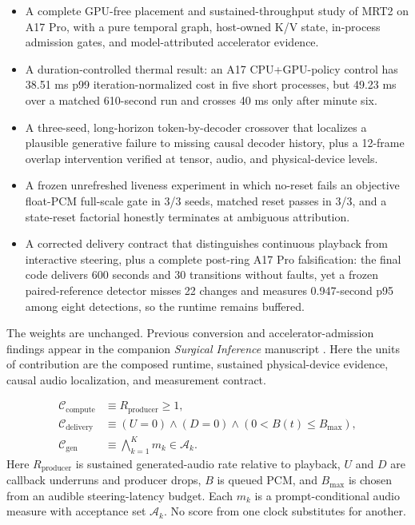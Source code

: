 \documentclass[10pt]{article}
\begin{document}
\begin{itemize}
\item A complete GPU-free placement and sustained-throughput study of MRT2 on A17 Pro, with a pure temporal graph, host-owned K/V state, in-process admission gates, and model-attributed accelerator evidence.
\item A duration-controlled thermal result: an A17 CPU+GPU-policy control has 38.51 ms p99 iteration-normalized cost in five short processes, but 49.23 ms over a matched 610-second run and crosses 40 ms only after minute six.
\item A three-seed, long-horizon token-by-decoder crossover that localizes a plausible generative failure to missing causal decoder history, plus a 12-frame overlap intervention verified at tensor, audio, and physical-device levels.
\item A frozen unrefreshed liveness experiment in which no-reset fails an objective float-PCM full-scale gate in 3/3 seeds, matched reset passes in 3/3, and a state-reset factorial honestly terminates at ambiguous attribution.
\item A corrected delivery contract that distinguishes continuous playback from interactive steering, plus a complete post-ring A17 Pro falsification: the final code delivers 600 seconds and 30 transitions without faults, yet a frozen paired-reference detector misses 22 changes and measures 0.947-second p95 among eight detections, so the runtime remains buffered.
\end{itemize}
The weights are unchanged. Previous conversion and accelerator-admission findings appear in the companion \emph{Surgical Inference} manuscript \citep{surgical-inference}. Here the units of contribution are the composed runtime, sustained physical-device evidence, causal audio localization, and measurement contract.


\begin{align}
\mathcal{C}_{\mathrm{compute}} &\equiv R_{\mathrm{producer}} \ge 1, \\
\mathcal{C}_{\mathrm{delivery}} &\equiv
  (U=0) \land (D=0) \land (0 < B(t) \le B_{\max}), \\
\mathcal{C}_{\mathrm{gen}} &\equiv \bigwedge_{k=1}^{K} m_k \in \mathcal{A}_k.
\end{align}
Here $R_{\mathrm{producer}}$ is sustained generated-audio rate relative to
playback, $U$ and $D$ are callback underruns and producer drops, $B$ is queued
PCM, and $B_{\max}$ is chosen from an audible steering-latency budget. Each
$m_k$ is a prompt-conditional audio measure with acceptance set $\mathcal{A}_k$.
No score from one clock substitutes for another.
\end{document}
